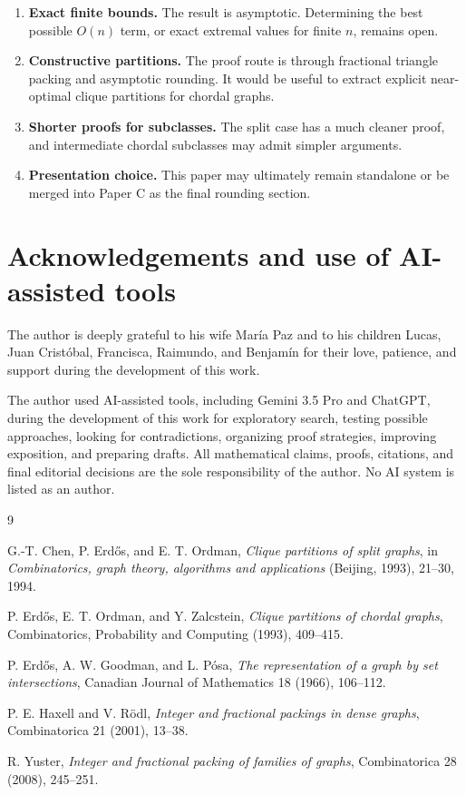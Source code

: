\documentclass[11pt]{article}
\theoremstyle{definition}
\begin{document}
\begin{enumerate}[label=(\roman*)]
    \item \textbf{Exact finite bounds.} The result is asymptotic. Determining the best possible \(O(n)\) term, or exact extremal values for finite \(n\), remains open.
    \item \textbf{Constructive partitions.} The proof route is through fractional triangle packing and asymptotic rounding. It would be useful to extract explicit near-optimal clique partitions for chordal graphs.
    \item \textbf{Shorter proofs for subclasses.} The split case has a much cleaner proof, and intermediate chordal subclasses may admit simpler arguments.
    \item \textbf{Presentation choice.} This paper may ultimately remain standalone or be merged into Paper C as the final rounding section.
\end{enumerate}

\section*{Acknowledgements and use of AI-assisted tools}

The author is deeply grateful to his wife María Paz and to his children Lucas, Juan Cristóbal, Francisca, Raimundo, and Benjamín for their love, patience, and support during the development of this work.

The author used AI-assisted tools, including Gemini 3.5 Pro and ChatGPT, during the development of this work for exploratory search, testing possible approaches, looking for contradictions, organizing proof strategies, improving exposition, and preparing drafts. All mathematical claims, proofs, citations, and final editorial decisions are the sole responsibility of the author. No AI system is listed as an author.

\begin{thebibliography}{9}

G.-T. Chen, P. Erdős, and E. T. Ordman,
\emph{Clique partitions of split graphs},
in \emph{Combinatorics, graph theory, algorithms and applications} (Beijing, 1993), 21--30, 1994.

P. Erdős, E. T. Ordman, and Y. Zalcstein,
\emph{Clique partitions of chordal graphs},
Combinatorics, Probability and Computing (1993), 409--415.

P. Erdős, A. W. Goodman, and L. Pósa,
\emph{The representation of a graph by set intersections},
Canadian Journal of Mathematics 18 (1966), 106--112.

P. E. Haxell and V. Rödl,
\emph{Integer and fractional packings in dense graphs},
Combinatorica 21 (2001), 13--38.

R. Yuster,
\emph{Integer and fractional packing of families of graphs},
Combinatorica 28 (2008), 245--251.

\end{thebibliography}
\end{document}

